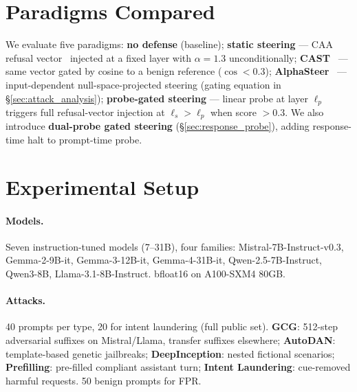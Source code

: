 \documentclass{article}
\begin{document}
\section{Paradigms Compared}
\label{sec:paradigms}

We evaluate five paradigms: \textbf{no defense} (baseline); \textbf{static steering} --- CAA refusal vector~\citep{turner2023activation} injected at a fixed layer with $\alpha = 1.3$ unconditionally; \textbf{CAST}~\citep{cast2025} --- same vector gated by cosine to a benign reference ($\cos < 0.3$); \textbf{AlphaSteer}~\citep{alphasteer2026} --- input-dependent null-space-projected steering (gating equation in \S\ref{sec:attack_analysis}); \textbf{probe-gated steering} --- linear probe at layer $\ell_p$ triggers full refusal-vector injection at $\ell_s > \ell_p$ when score $> 0.3$. We also introduce \textbf{dual-probe gated steering} (\S\ref{sec:response_probe}), adding response-time halt to prompt-time probe.

\section{Experimental Setup}
\label{sec:setup}

\paragraph{Models.} Seven instruction-tuned models (7--31B), four families: Mistral-7B-Instruct-v0.3, Gemma-2-9B-it, Gemma-3-12B-it, Gemma-4-31B-it, Qwen-2.5-7B-Instruct, Qwen3-8B, Llama-3.1-8B-Instruct. bfloat16 on A100-SXM4 80GB.

\paragraph{Attacks.} 40 prompts per type, 20 for intent laundering (full public set). \textbf{GCG}: 512-step adversarial suffixes on Mistral/Llama, transfer suffixes elsewhere; \textbf{AutoDAN}: template-based genetic jailbreaks; \textbf{DeepInception}: nested fictional scenarios; \textbf{Prefilling}: pre-filled compliant assistant turn; \textbf{Intent Laundering}: cue-removed harmful requests. 50 benign prompts for FPR.
\end{document}
